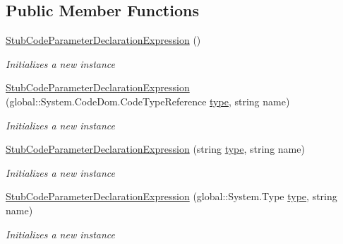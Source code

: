 \subsection*{Public Member Functions}
\begin{DoxyCompactItemize}
\item 
\hyperlink{class_system_1_1_code_dom_1_1_fakes_1_1_stub_code_parameter_declaration_expression_a5e7460afa50ac2e0dcef22b02c04d0e3}{Stub\-Code\-Parameter\-Declaration\-Expression} ()
\begin{DoxyCompactList}\small\item\em Initializes a new instance\end{DoxyCompactList}\item 
\hyperlink{class_system_1_1_code_dom_1_1_fakes_1_1_stub_code_parameter_declaration_expression_a644f8f6615c13c2dd67345b684565c7c}{Stub\-Code\-Parameter\-Declaration\-Expression} (global\-::\-System.\-Code\-Dom.\-Code\-Type\-Reference \hyperlink{jquery-1_810_82-vsdoc_8js_a3940565e83a9bfd10d95ffd27536da91}{type}, string name)
\begin{DoxyCompactList}\small\item\em Initializes a new instance\end{DoxyCompactList}\item 
\hyperlink{class_system_1_1_code_dom_1_1_fakes_1_1_stub_code_parameter_declaration_expression_adc1c694addfc581f3aefbffe8b6ea36f}{Stub\-Code\-Parameter\-Declaration\-Expression} (string \hyperlink{jquery-1_810_82-vsdoc_8js_a3940565e83a9bfd10d95ffd27536da91}{type}, string name)
\begin{DoxyCompactList}\small\item\em Initializes a new instance\end{DoxyCompactList}\item 
\hyperlink{class_system_1_1_code_dom_1_1_fakes_1_1_stub_code_parameter_declaration_expression_a59cd04f72aa277ffdfb818adbaaa45ef}{Stub\-Code\-Parameter\-Declaration\-Expression} (global\-::\-System.\-Type \hyperlink{jquery-1_810_82-vsdoc_8js_a3940565e83a9bfd10d95ffd27536da91}{type}, string name)
\begin{DoxyCompactList}\small\item\em Initializes a new instance\end{DoxyCompactList}\end{DoxyCompactItemize}
